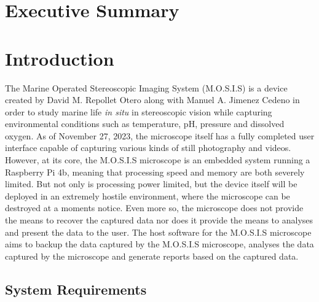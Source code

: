 \documentclass[12pt]{article}
\begin{document}

\section*{Executive Summary}
\tableofcontents
{}
\section{Introduction}
The Marine Operated Stereoscopic Imaging System (M.O.S.I.S) is a device created by David M. Repollet Otero along with Manuel A. Jimenez Cedeno in order to study marine life \textit{in situ} in stereoscopic vision while capturing environmental conditions such as temperature, pH, pressure and dissolved oxygen. As of November 27, 2023, the microscope itself has a fully completed user interface capable of capturing various kinds of still photography and videos. However, at its core, the M.O.S.I.S microscope is an embedded system running a Raspberry Pi 4b, meaning that processing speed and memory are both severely limited. But not only is processing power limited, but the device itself will be deployed in an extremely hostile environment, where the microscope can be destroyed at a moments notice. Even more so, the microscope does not provide the means to recover the captured data nor does it provide the means to analyses and present the data to the user. The host software for the M.O.S.I.S microscope aims to backup the data captured by the M.O.S.I.S microscope, analyses the data captured by the microscope and generate reports based on the captured data.\\
\subsection{System Requirements}
\end{document}
